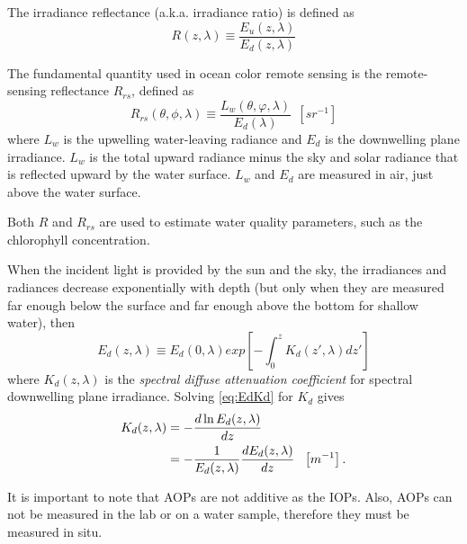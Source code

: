 The irradiance reflectance (a.k.a. irradiance ratio) is defined as
\begin{equation}
  R(z,\lambda)\equiv \frac{E_u(z,\lambda)}{E_d(z,\lambda)}
\end{equation}

The fundamental quantity used in ocean color remote sensing is the remote-sensing reflectance $R_{rs}$, defined as
\begin{equation}
  R_{rs}(\theta,\phi,\lambda)\equiv \frac{L_w(\theta,\varphi,\lambda)}{E_d(\lambda)}~~\left[sr^{-1} \right]
\end{equation}
where $L_w$ is the upwelling water-leaving radiance and $E_d$ is the downwelling plane irradiance. $L_w$ is the total upward radiance minus the sky and solar radiance that is reflected upward by the water surface. $L_w$ and $E_d$ are measured in air, just above the water surface.

Both $R$ and $R_{rs}$ are used to estimate water quality parameters, such as the chlorophyll concentration.

When the incident light is provided by the sun and the sky, the irradiances and radiances decrease exponentially with depth (but only when they are measured far enough below the surface and far enough above the bottom for shallow water), then
\begin{equation}\label{eq:EdKd}
  E_d(z,\lambda)\equiv E_d(0,\lambda) exp\left[-\int_0^{z}K_d(z',\lambda)dz'\right]
\end{equation}
where $K_d(z,\lambda)$ is the {\it spectral diffuse attenuation coefficient} for spectral downwelling plane irradiance. Solving \autoref{eq:EdKd} for $K_d$ gives
\begin{align}
  K_d(z,\lambda)  &=- \frac{d\ln E_d(z,\lambda)}{dz} \notag \\
          &=-\frac{1}{E_d(z,\lambda)}\frac{dE_d(z,\lambda)}{dz} ~~\left[m^{-1} \right].
\end{align}

It is important to note that AOPs are not additive as the IOPs. Also, AOPs can not be measured in the lab or on a water sample, therefore they must be measured in situ.



